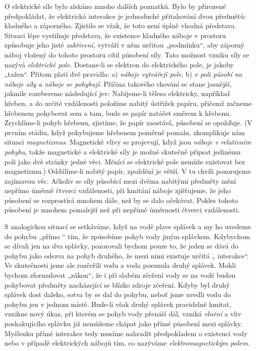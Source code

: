     O elektrické síle bylo získáno mnoho dalších poznatků. Bylo by přirozené předpokládat, že
    elektrická interakce je jednoduché přitahování dvou předmětů: kladného a záporného. Zjistilo se
    však, že toto není úplně vhodná představa. Situaci lépe vystihuje představa, že existence
    kladného náboje v prostoru způsobuje jeho jisté \emph{zakřivení}, vytváří v něm určitou
    „podmínku“, aby záporný náboj vložený do tohoto prostoru cítil působení síly. Tato možnost
    vzniku síly se nazývá \emph{elektrické pole}. Dostane-li se elektron do elektrického pole, je
    jakoby „tažen“. Přitom platí dvě pravidla: a) \emph{náboje vytvářejí pole}, b) \emph{v poli
    působí na náboje síly a náboje se pohybují}. Příčina takového chování se stane jasnější, jakmile
    rozebereme následující jev: Nabijeme-li těleso elektricky, například hřeben, a do určité
    vzdálenosti položíme nabitý ústřižek papíru, přičemž začneme hřebenem pohybovat sem a tam, bude
    se papír natáčet směrem k hřebenu. Zrychlíme-li pohyb hřebenu, zjistíme, že papír zaostává,
    působení se opožďuje. (V prvním stádiu, když pohybujeme hřebenem poměrně pomalu, zkomplikuje nám
    situaci \emph{magnetizmus}. Magnetické vlivy se projevují, když jsou \emph{náboje v relativním
    pohybu}, takže magnetické a elektrické síly je možné skutečně připsat jedinému poli jako dvě
    stránky jedné věci. Měnící se elektrické pole nemůže existovat bez magnetizmu.) Oddálíme-li
    nabitý papír, zpoždění je větší. V tu chvíli pozorujeme zajímavou věc. Ačkoliv se síly působící
    mezi dvěma nabitými předměty mění nepřímo úměrně čtverci vzdálenosti, při kmitání náboje
    zjišťujeme, že jeho působení se rozprostírá mnohem dále, než by se dalo očekávat. Pokles tohoto
    působení je mnohem pomalejší než při nepřímé úměrnosti čtverci vzdálenosti.
    
    S analogickou situací se setkáváme, když na vodě plave splávek a my ho uvedeme do pohybu „přímo
    “ tím, že způsobíme pohyb vody jiným splávkem. Kdybychom se dívali jen na dva splávky,
    pozorovali bychom pouze to, že jeden se dává do pohybu jako odezva na pohyb druhého, že mezi
    nimi existuje určitá „  interakce“. Ve skutečnosti jsme ale rozčeřili vodu a voda posunula druhý
    splávek. Mohli bychom zformulovat „zákon“, že i při slabém zčeření vody se na vodě budou
    pohybovat předměty nacházející se blízko zdroje zčeření. Kdyby byl druhý splávek dost daleko,
    sotva by se dal do pohybu, neboť jsme uvedli vodu do pohybu jen v jednom místě. Bude-li však
    druhý splávek pravidelně kmitat, vznikne nový úkaz, při kterém se pohyb vody přenáší dál, vzniká
    \emph{vlnění} a vliv poskakujícího splávku již nemůžeme chápat jako přímé působení mezi splávky.
    Myšlenku přímé interakce tedy musíme nahradit předpokladem o existenci vody nebo v případě
    elektrických nábojů tím, co nazýváme \emph{elektromagnetickým polem}.
    
